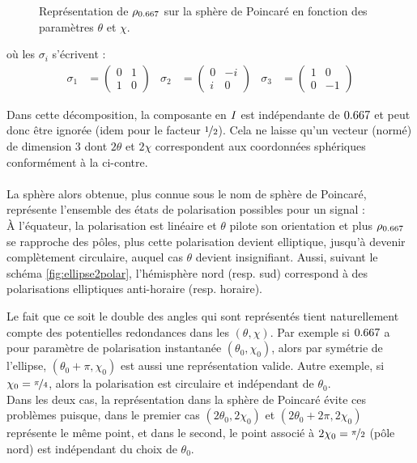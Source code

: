\begin{figure}
	
	\caption[\DONE Projection sur la sphère de Poincaré]{Représentation de $\rho_{\x}$ sur la sphère de Poincaré en fonction des paramètres $\theta$ et $\chi$.}
	\label{fig:sphere2poincare}
\end{figure}

\par \noindent
où les $\sigma_i$ s'écrivent :
\begin{align*}
	\sigma_1 &= \begin{pmatrix} 0 & 1 \\ 1 &  0 \end{pmatrix}  &
	\sigma_2 &= \begin{pmatrix} 0 & -i \\  i &  0 \end{pmatrix}  &
	\sigma_3 &= \begin{pmatrix} 1 & 0 \\ 0 & -1 \end{pmatrix}
\end{align*}
\skipl

Dans cette décomposition, la composante en $I_{}$ est indépendante de $\x$ et peut donc être ignorée (idem pour le facteur $\nicefrac{1}{2}$). Cela ne laisse qu'un vecteur (normé) de dimension 3 dont $2\theta$ et $2\chi$ correspondent aux coordonnées sphériques conformément à la  ci-contre.
\\ 
\\
La sphère alors obtenue, plus connue sous le nom de sphère de Poincaré, représente l'ensemble des états de polarisation possibles pour un signal :
\\
À l'équateur, la polarisation est linéaire et $\theta$ pilote son orientation et plus $\rho_{\x}$ se rapproche des pôles, plus cette polarisation devient elliptique, jusqu'à devenir complètement circulaire, auquel cas $\theta$ devient insignifiant. 
Aussi, suivant le schéma \cref{fig:ellipse2polar}, l'hémisphère nord (resp. sud) correspond à des polarisations elliptiques anti-horaire (resp. horaire).

Le fait que ce soit le double des angles qui sont représentés tient naturellement compte des potentielles redondances dans les $(\theta,\chi)$. 
Par exemple si $\x$ a pour paramètre de polarisation instantanée $(\theta_0, \chi_0)$, alors par symétrie de l'ellipse, $(\theta_0+\pi, \chi_0)$ est aussi une représentation valide. Autre exemple, si $\chi_0 = \nicefrac{\pi}{4}$, alors la polarisation est circulaire et indépendant de $\theta_0$.
\\
Dans les deux cas, la représentation dans la sphère de Poincaré évite ces problèmes puisque, dans le premier cas $(2\theta_0, 2\chi_0)$ et $(2\theta_0+2\pi, 2\chi_0)$ représente le même point, et dans le second, le point associé à $2\chi_0=\nicefrac{\pi}{2}$ (pôle nord) est indépendant du choix de $\theta_0$.

